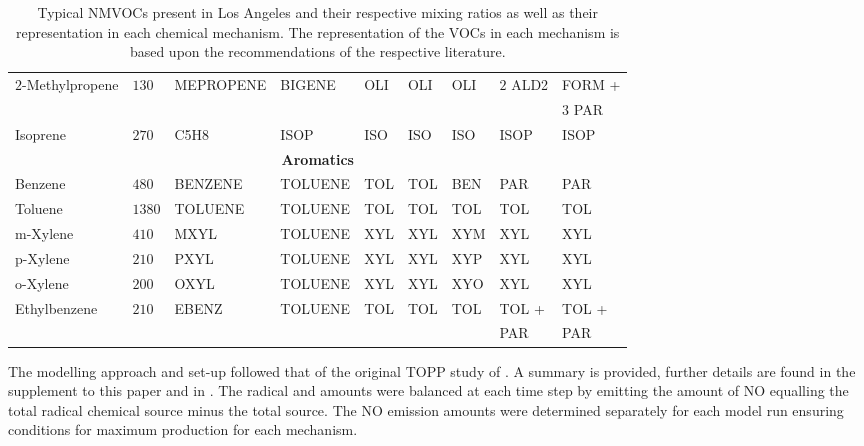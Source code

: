 \begin{table}
\begin{center}
\begin{tabular}{lllllllll}
            \multirow{2}{*}{$2$-Methylpropene} & \multirow{2}{*}{$130$} & \multirow{2}{*}{MEPROPENE} & \multirow{2}{*}{BIGENE} & \multirow{2}{*}{OLI} & \multirow{2}{*}{OLI} & \multirow{2}{*}{OLI} & \multirow{2}{*}{$2$ ALD2} & FORM + \\ & & & & & & & & \hspace{3mm}$3$ PAR \\
            Isoprene & $270$ & C5H8 & ISOP & ISO & ISO & ISO & ISOP & ISOP \\ \hline
            \multicolumn{9}{c}{\textbf{Aromatics}} \\ \hline 
            Benzene & $480$ & BENZENE & TOLUENE & TOL & TOL & BEN & PAR & PAR \\
            Toluene & $1380$ & TOLUENE & TOLUENE & TOL & TOL & TOL & TOL & TOL \\
            m-Xylene & $410$ & MXYL & TOLUENE & XYL & XYL & XYM & XYL & XYL \\
            p-Xylene & $210$ & PXYL & TOLUENE & XYL & XYL & XYP & XYL & XYL \\
            o-Xylene & $200$ & OXYL & TOLUENE & XYL & XYL & XYO & XYL & XYL \\
            \multirow{2}{*}{Ethylbenzene} & \multirow{2}{*}{$210$} & \multirow{2}{*}{EBENZ} & \multirow{2}{*}{TOLUENE} & \multirow{2}{*}{TOL} & \multirow{2}{*}{TOL} & \multirow{2}{*}{TOL} & TOL + & TOL + \\ & & & & & & & \hspace{3mm}PAR & \hspace{3mm}PAR \\ \hline \hline
        \end{tabular}
    \end{center}
    \caption{Typical NMVOCs present in Los Angeles and their respective mixing ratios \citep{Baker:2008} as well as their representation in each chemical mechanism. The representation of the VOCs in each mechanism is based upon the recommendations of the respective literature.}
    \label{t:initial_conditions}
\end{table}

The modelling approach and set-up followed that of the original TOPP study of \citet{Butler:2011}.
A summary is provided, further details are found in the supplement to this paper and in \citet{Butler:2011}. 
The radical and  amounts were balanced at each time step by emitting the amount of NO equalling the total radical chemical source minus the total  source.
The NO emission amounts were determined separately for each model run ensuring conditions for maximum  production for each mechanism.

